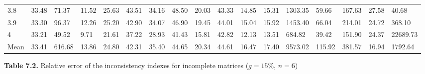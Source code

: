 \begin{adjustbox}{angle=90}
\begin{center}
{\begin{tabular}{|l|llllllllllllllll|}
3.8&33.48&71.37&11.52&25.63&43.51&34.16&48.50&20.03&43.33&14.85&15.31&1303.35&59.66&167.63&27.58&40.68  \\ 
3.9&33.30&96.37&12.26&25.20&42.90&34.07&46.90&19.45&44.01&15.04&15.92&1453.40&66.04&214.01&24.72&368.10  \\ 
4&33.21&49.52&9.71&21.61&37.22&28.93&41.43&15.81&42.82&12.13&13.51&684.82&39.42&151.90&24.37&22689.73  \\ \hline \hline
Mean&33.41&616.68&13.86&24.80&42.31&35.40&44.65&20.34&44.61&16.47&17.40&9573.02&115.92&381.57&16.94&1792.64  \\ \hline
\end{tabular}
}
\end{center}
\end{adjustbox}




\newpage
\textbf{Table 7.2.} Relative error of the inconsistency indexes for incomplete matrices ($g=15\%$, $n=6$)
